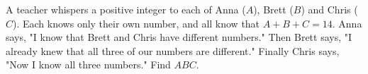 A teacher whispers a positive integer to each of Anna ($A$), Brett ($B$) and Chris ($C$). Each knows only their own number, and all know that $A+B+C=14$. Anna says, "I know that Brett and Chris have different numbers." Then Brett says, "I already knew that all three of our numbers are different." Finally Chris says, "Now I know all three numbers." Find $ABC$.
